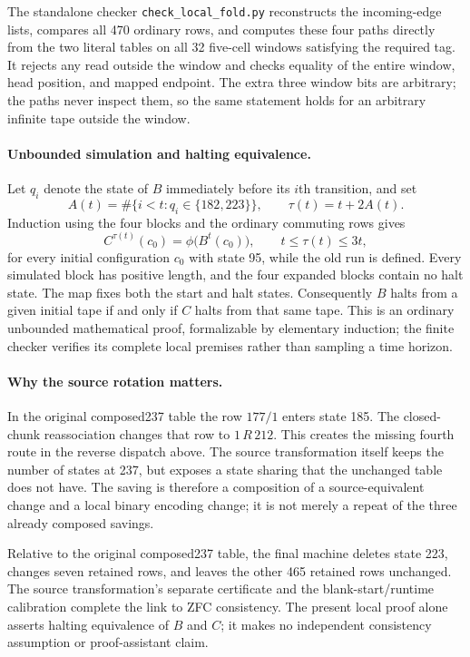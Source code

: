 The standalone checker \texttt{check\_local\_fold.py} reconstructs the
incoming-edge lists, compares all 470 ordinary rows, and computes these
four paths directly from the two literal tables on all 32 five-cell
windows satisfying the required tag. It rejects any read outside the
window and checks equality of the entire window, head position, and
mapped endpoint. The extra three window bits are arbitrary; the paths
never inspect them, so the same statement holds for an arbitrary infinite
tape outside the window.

\paragraph{Unbounded simulation and halting equivalence.}
Let $q_i$ denote the state of $B$ immediately before its $i$th transition,
and set
\[
 A(t)=\#\{i<t:q_i\in\{182,223\}\},\qquad
 \tau(t)=t+2A(t).
\]
Induction using the four blocks and the ordinary commuting rows gives
\[
 C^{\tau(t)}(c_0)=\phi\bigl(B^t(c_0)\bigr),
 \qquad t\leq\tau(t)\leq3t,
\]
for every initial configuration $c_0$ with state 95, while the old run is
defined. Every simulated block has positive length, and the four expanded
blocks contain no halt state. The map fixes both the start and halt
states. Consequently $B$ halts from a given initial tape if and only if
$C$ halts from that same tape. This is an ordinary unbounded mathematical
proof, formalizable by elementary induction; the finite checker verifies
its complete local premises rather than sampling a time horizon.

\paragraph{Why the source rotation matters.}
In the original composed237 table the row $177/1$ enters state 185. The
closed-chunk reassociation changes that row to $1\,R\,212$. This creates
the missing fourth route in the reverse dispatch above. The source
transformation itself keeps the number of states at 237, but exposes a
state sharing that the unchanged table does not have. The saving is
therefore a composition of a source-equivalent change and a local binary
encoding change; it is not merely a repeat of the three already composed
savings.

Relative to the original composed237 table, the final machine deletes
state 223, changes seven retained rows, and leaves the other 465 retained
rows unchanged. The source transformation's separate certificate and the
blank-start/runtime calibration complete the link to ZFC consistency.
The present local proof alone asserts halting equivalence of $B$ and $C$;
it makes no independent consistency assumption or proof-assistant claim.

